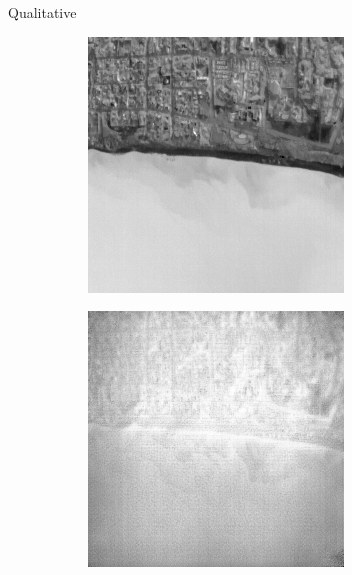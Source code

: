 \begin{frame}{Qualitative}
\begin{figure}
        \begin{subfigure}[b]{0.185\textwidth}
            \centering
            \includegraphics[width=\textwidth]{../figs/outputs/pan/28.png}
            \label{fig:pan}
        \end{subfigure}
        \hspace{0.05em}%
        \begin{subfigure}[b]{0.185\textwidth}
            \centering
            \includegraphics[width=\textwidth]{../figs/outputs/cut/28.png}

\end{subfigure}
\end{figure}
\end{frame}
